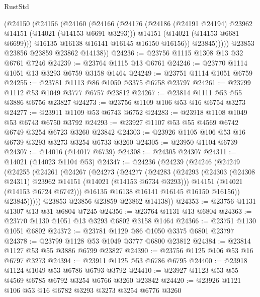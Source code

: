 \begin{lexlean}{RustStd}
\begin{coremodule}
              (@24150
                (@24156
                  (@24160
                    (@24166
                      (@24176
                        (@24186 (@24191 @24194) @23962 @14151 (@14021 (@14153 @6691 @3293)))
                        @14151
                        (@14021 (@14153 @6681 @6699)))
                      @16135
                      @16138
                      @16141
                      @16145
                      @16150
                      @16156))
                  @23845)))))
        @23853
        @23856
        @23859
        @23862
        @14138))
@24236 := @23756 @1115 @1308 @13 @32 @6761 @7246
@24239 := @23764 @1115 @13 @6761
@24246 := @23770 @1114 @1051 @13 @3293 @6759 @3158 @1464
@24249 := @23751 @1114 @1051 @6759
@24255 := @23781 @1113 @86 @1050 @3375 @6758 @23797
@24261 := @23799 @1112 @53 @1049 @3777 @6757 @23812
@24267 := @23814 @1111 @53 @55 @3886 @6756 @23827
@24273 := @23756 @1109 @106 @53 @16 @6754 @3273
@24277 := @23911 @1109 @53 @6743 @6752
@24283 := @23918 @1108 @1049 @53 @6743 @6750 @3792
@24293 := @23927 @1107 @53 @55 @4569 @6742 @6749 @3254 @6723 @3260 @23842
@24303 := @23926 @1105 @106 @53 @16 @6739 @3293 @3273 @3254 @6733 @3260
@24305 := @23950 @1104 @6739
@24307 := @14016 (@14017 @6739)
@24308 := @24305 @24307
@24311 := @14021 (@14023 @1104 @53)
@24347 := @24236
    (@24239
      (@24246
        (@24249
          (@24255
            (@24261
              (@24267
                (@24273
                  (@24277
                    (@24283
                      (@24293
                        (@24303 (@24308 @24311) @23962 @14151 (@14021 (@14153 @6734 @3293)))
                        @14151
                        (@14021 (@14153 @6724 @6742)))
                      @16135
                      @16138
                      @16141
                      @16145
                      @16150
                      @16156))
                  @23845)))))
        @23853
        @23856
        @23859
        @23862
        @14138))
@24353 := @23756 @1131 @1307 @13 @31 @6804 @7245
@24356 := @23764 @1131 @13 @6804
@24363 := @23770 @1130 @1051 @13 @3293 @6802 @3158 @1464
@24366 := @23751 @1130 @1051 @6802
@24372 := @23781 @1129 @86 @1050 @3375 @6801 @23797
@24378 := @23799 @1128 @53 @1049 @3777 @6800 @23812
@24384 := @23814 @1127 @53 @55 @3886 @6799 @23827
@24390 := @23756 @1125 @106 @53 @16 @6797 @3273
@24394 := @23911 @1125 @53 @6786 @6795
@24400 := @23918 @1124 @1049 @53 @6786 @6793 @3792
@24410 := @23927 @1123 @53 @55 @4569 @6785 @6792 @3254 @6766 @3260 @23842
@24420 := @23926 @1121 @106 @53 @16 @6782 @3293 @3273 @3254 @6776 @3260

\end{coremodule}
\end{lexlean}
